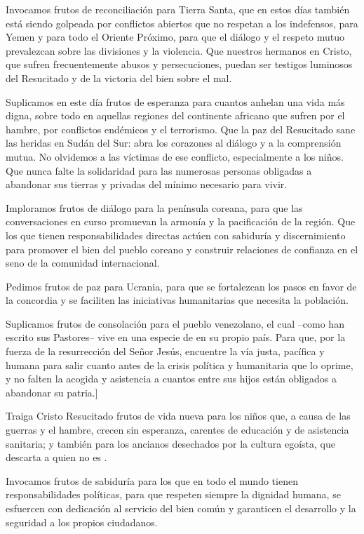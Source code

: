 \begin{body}
{Invocamos frutos de reconciliación para Tierra Santa, que en estos días también está siendo golpeada por conflictos abiertos que no respetan a los indefensos, para Yemen y para todo el Oriente Próximo, para que el diálogo y el respeto mutuo prevalezcan sobre las divisiones y la violencia. Que nuestros hermanos en Cristo, que sufren frecuentemente abusos y persecuciones, puedan ser testigos luminosos del Resucitado y de la victoria del bien sobre el mal.

Suplicamos en este día frutos de esperanza para cuantos anhelan una vida más digna, sobre todo en aquellas regiones del continente africano que sufren por el hambre, por conflictos endémicos y el terrorismo. Que la paz del Resucitado sane las heridas en Sudán del Sur: abra los corazones al diálogo y a la comprensión mutua. No olvidemos a las víctimas de ese conflicto, especialmente a los niños. Que nunca falte la solidaridad para las numerosas personas obligadas a abandonar sus tierras y privadas del mínimo necesario para vivir.

Imploramos frutos de diálogo para la península coreana, para que las conversaciones en curso promuevan la armonía y la pacificación de la región. Que los que tienen responsabilidades directas actúen con sabiduría y discernimiento para promover el bien del pueblo coreano y construir relaciones de confianza en el seno de la comunidad internacional.

Pedimos frutos de paz para Ucrania, para que se fortalezcan los pasos en favor de la concordia y se faciliten las iniciativas humanitarias que necesita la población.

Suplicamos frutos de consolación para el pueblo venezolano, el cual –como han escrito sus Pastores– vive en una especie de  en su propio país. Para que, por la fuerza de la resurrección del Señor Jesús, encuentre la vía justa, pacífica y humana para salir cuanto antes de la crisis política y humanitaria que lo oprime, y no falten la acogida y asistencia a cuantos entre sus hijos están obligados a abandonar su patria.]}

Traiga Cristo Resucitado frutos de vida nueva para los niños que, a causa de las guerras y el hambre, crecen sin esperanza, carentes de educación y de asistencia sanitaria; y también para los ancianos desechados por la cultura egoísta, que descarta a quien no es .

Invocamos frutos de sabiduría para los que en todo el mundo tienen responsabilidades políticas, para que respeten siempre la dignidad humana, se esfuercen con dedicación al servicio del bien común y garanticen el desarrollo y la seguridad a los propios ciudadanos.


\end{body}
